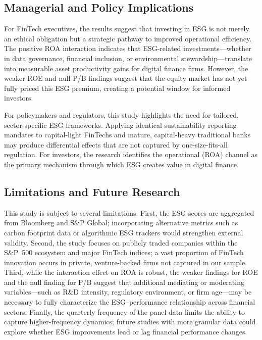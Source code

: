 \documentclass[12pt]{article}
\begin{document}
\subsection{Managerial and Policy Implications}
For FinTech executives, the results suggest that investing in ESG is not merely an ethical obligation but a strategic pathway to improved operational efficiency. The positive ROA interaction indicates that ESG-related investments---whether in data governance, financial inclusion, or environmental stewardship---translate into measurable asset productivity gains for digital finance firms. However, the weaker ROE and null P/B findings suggest that the equity market has not yet fully priced this ESG premium, creating a potential window for informed investors.

For policymakers and regulators, this study highlights the need for tailored, sector-specific ESG frameworks. Applying identical sustainability reporting mandates to capital-light FinTechs and mature, capital-heavy traditional banks may produce differential effects that are not captured by one-size-fits-all regulation. For investors, the research identifies the operational (ROA) channel as the primary mechanism through which ESG creates value in digital finance.

\subsection{Limitations and Future Research}
This study is subject to several limitations. First, the ESG scores are aggregated from Bloomberg and S\&P Global; incorporating alternative metrics such as carbon footprint data or algorithmic ESG trackers would strengthen external validity. Second, the study focuses on publicly traded companies within the S\&P~500 ecosystem and major FinTech indices; a vast proportion of FinTech innovation occurs in private, venture-backed firms not captured in our sample. Third, while the interaction effect on ROA is robust, the weaker findings for ROE and the null finding for P/B suggest that additional mediating or moderating variables---such as R\&D intensity, regulatory environment, or firm age---may be necessary to fully characterize the ESG--performance relationship across financial sectors. Finally, the quarterly frequency of the panel data limits the ability to capture higher-frequency dynamics; future studies with more granular data could explore whether ESG improvements lead or lag financial performance changes.

\end{document}
